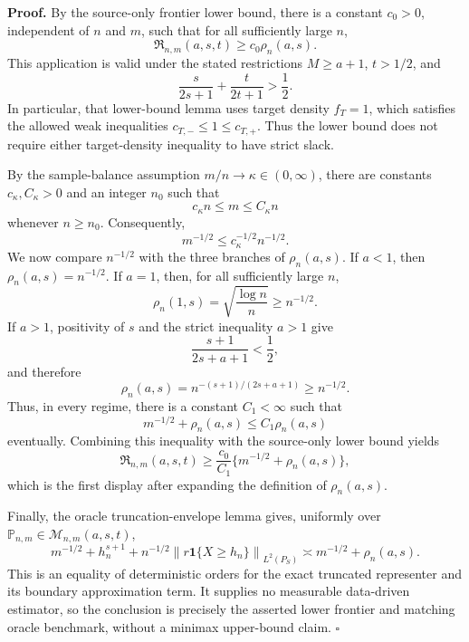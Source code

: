 \textbf{Proof.}
By the source-only frontier lower bound, there is a constant \(c_0>0\), independent of \(n\) and \(m\), such that for all sufficiently large \(n\),
\[
\mathfrak R_{n,m}(a,s,t)\ge c_0\rho_n(a,s).
\]
This application is valid under the stated restrictions \(M\ge a+1\), \(t>1/2\), and
\[
\frac{s}{2s+1}+\frac{t}{2t+1}>\frac12.
\]
In particular, that lower-bound lemma uses target density \(f_T=1\), which satisfies the allowed weak inequalities \(c_{T,-}\le 1\le c_{T,+}\).  Thus the lower bound does not require either target-density inequality to have strict slack.

By the sample-balance assumption \(m/n\to\kappa\in(0,\infty)\), there are constants \(c_\kappa,C_\kappa>0\) and an integer \(n_0\) such that
\[
c_\kappa n\le m\le C_\kappa n
\]
whenever \(n\ge n_0\).  Consequently,
\[
m^{-1/2}\le c_\kappa^{-1/2}n^{-1/2}.
\]
We now compare \(n^{-1/2}\) with the three branches of \(\rho_n(a,s)\).  If \(a<1\), then \(\rho_n(a,s)=n^{-1/2}\).  If \(a=1\), then, for all sufficiently large \(n\),
\[
\rho_n(1,s)=\sqrt{\frac{\log n}{n}}\ge n^{-1/2}.
\]
If \(a>1\), positivity of \(s\) and the strict inequality \(a>1\) give
\[
\frac{s+1}{2s+a+1}<\frac12,
\]
and therefore
\[
\rho_n(a,s)=n^{-(s+1)/(2s+a+1)}\ge n^{-1/2}.
\]
Thus, in every regime, there is a constant \(C_1<\infty\) such that
\[
m^{-1/2}+\rho_n(a,s)\le C_1\rho_n(a,s)
\]
eventually.  Combining this inequality with the source-only lower bound yields
\[
\mathfrak R_{n,m}(a,s,t)
\ge \frac{c_0}{C_1}\{m^{-1/2}+\rho_n(a,s)\},
\]
which is the first display after expanding the definition of \(\rho_n(a,s)\).

Finally, the oracle truncation-envelope lemma gives, uniformly over \(\mathbb P_{n,m}\in\mathcal M_{n,m}(a,s,t)\),
\[
m^{-1/2}+h_n^{s+1}+n^{-1/2}
\left\|r\mathbf 1\{X\ge h_n\}\right\|_{L^2(P_S)}
\asymp m^{-1/2}+\rho_n(a,s).
\]
This is an equality of deterministic orders for the exact truncated representer and its boundary approximation term.  It supplies no measurable data-driven estimator, so the conclusion is precisely the asserted lower frontier and matching oracle benchmark, without a minimax upper-bound claim. \(\square\)